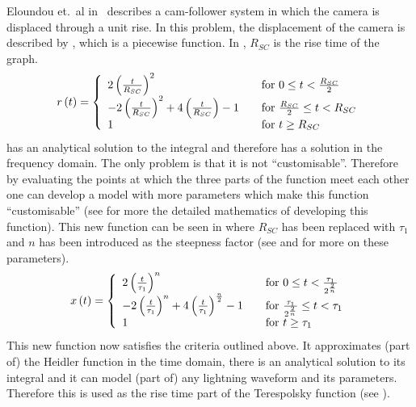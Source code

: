 Eloundou et.\ al in~\cite{Eloundou2002} describes a cam-follower system in which the camera is displaced through a unit rise. In this problem, the displacement of the camera is described by , which is a piecewise function. In , $R_{SC}$ is the rise time of the graph.
\begin{equation}
    r \left( t \right) = \left\{
      \begin{array}{l l}
        2 \left( \frac{t}{R_{SC}} \right )^2 & \quad \textrm{for $0 \leq t < \frac{R_{SC}}{2}$} \\
        -2 \left( \frac{t}{R_{SC}} \right )^2 +4 \left( \frac{t}{R_{SC}} \right ) -1 & \quad \textrm{for $\frac{R_{SC}}{2} \leq t < R_{SC}$} \\
        1 & \quad \textrm{for $t \geq R_{SC}$}
      \end{array} \right.
    \label{eqn:eloundou}
\end{equation}
 has an analytical solution to the integral and therefore has a solution in the frequency domain. The only problem is that it is not ``customisable''. Therefore by evaluating the points at which the three parts of the function meet each other one can develop a model with more parameters which make this function ``customisable'' (see  for more the detailed mathematics of developing this function). This new function can be seen in  where $R_{SC}$ has been replaced with $\tau_1$ and $n$ has been introduced as the steepness factor (see  and  for more on these parameters).
\begin{equation}
    x \left( t \right) = \left\{
      \begin{array}{l l}
        2 \left( \frac{t}{\tau_1} \right )^n & \quad \textrm{for $0 \leq t < \frac{\tau_1}{2^{\frac{2}{n}}}$} \\
        -2 \left( \frac{t}{\tau_1} \right )^n +4 \left( \frac{t}{\tau_1} \right )^{\frac{n}{2}} -1 & \quad \textrm{for $\frac{\tau_1}{2^{\frac{2}{n}}} \leq t < \tau_1$} \\
        1 & \quad \textrm{for $t \geq \tau_1$}
      \end{array} \right.
    \label{eqn:elRiseCust}
\end{equation}
This new function now satisfies the criteria outlined above. It approximates (part of) the Heidler function in the time domain, there is an analytical solution to its integral and it can model (part of) any lightning waveform and its parameters. Therefore this is used as the rise time part of the Terespolsky function (see ).


